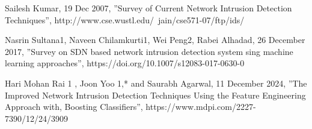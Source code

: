 \documentclass[conference]{IEEEtran}
\begin{document}
\begin{thebibliography}{00}
     Sailesh Kumar, 19 Dec 2007, ''Survey of Current Network Intrusion Detection Techniques'', http://www.cse.wustl.edu/~jain/cse571-07/ftp/ids/
    
     Nasrin Sultana1, Naveen Chilamkurti1, Wei Peng2, Rabei Alhadad, 26 December 2017, ''Survey on SDN based network intrusion detection system sing machine learning approaches'', https://doi.org/10.1007/s12083-017-0630-0
    
     Hari Mohan Rai 1 , Joon Yoo 1,* and Saurabh Agarwal, 11 December 2024, ''The Improved Network Intrusion Detection Techniques Using the Feature Engineering Approach with, Boosting Classifiers'', https://www.mdpi.com/2227-7390/12/24/3909
    
\end{thebibliography}



\end{document}
